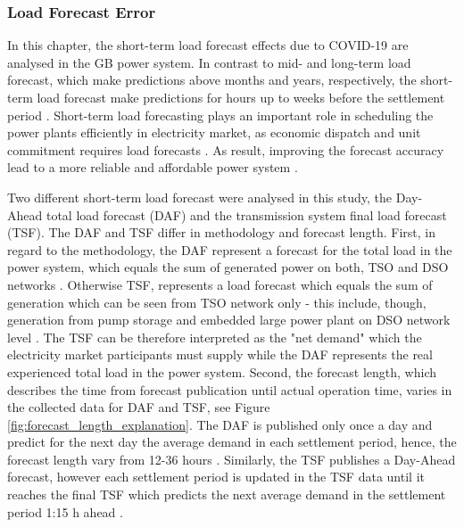 \documentclass[energies,article,submit,moreauthors,pdftex]{Definitions/mdpi}
\begin{document}
\subsubsection{Load Forecast Error}\label{DemandForecastError}
In this chapter, the short-term load forecast effects due to COVID-19 are analysed in the GB power system. In contrast to mid- and long-term load forecast, which make predictions above months and years, respectively, the short-term load forecast make predictions for hours up to weeks before the settlement period \cite{SahayDayNetwork,Khuntia2016ForecastingReview}. Short-term load forecasting plays an important role in scheduling the power plants efficiently in electricity market, as economic dispatch and unit commitment requires load forecasts \cite{He2020Day-aheadForest}. As result, improving the forecast accuracy lead to a more reliable and affordable power system \cite{SahayDayNetwork}. 

Two different short-term load forecast were analysed in this study, the Day-Ahead total load forecast (DAF) and the transmission system final load forecast (TSF). The DAF and TSF differ in methodology and forecast length. First, in regard to the methodology, the DAF represent a forecast for the total load in the power system, which equals the sum of generated power on both, TSO and DSO networks \cite{ENTSO-E2020ENTSO-EPlatform}. Otherwise TSF, represents a load forecast which equals the sum of generation which can be seen from TSO network only - this include, though, generation from pump storage and embedded large power plant on DSO network level \cite{NationalGrid2020THE40}. The TSF can be therefore interpreted as the "net demand" which the electricity market participants must supply while the DAF represents the real experienced total load in the power system. Second, the forecast length, which describes the time from forecast publication until actual operation time, varies in the collected data for DAF and TSF, see Figure \ref{fig:forecast_length_explanation}. The DAF is published only once a day and predict for the next day the average demand in each settlement period, hence, the forecast length vary from 12-36 hours \cite{ENTSO-E2020ENTSO-EPlatform}. Similarly, the TSF publishes a Day-Ahead forecast, however each settlement period is updated in the TSF data until it reaches the final TSF which predicts the next average demand in the settlement period 1:15 h ahead \cite{ELEXON2020ELEXONBMRS}.
\end{document}
